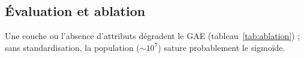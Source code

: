 \subsection{Évaluation et ablation}

\begin{table}[!ht]
\centering
\footnotesize
\caption{Ablation du GAE ($r=10\,\%$, 5 graines).}
\label{tab:ablation}
\setlength{\tabcolsep}{3pt}
\end{table}

Une couche ou l'absence d'attributs dégradent le GAE (tableau~\ref{tab:ablation}) ; sans standardisation, la population ($\sim10^7$) sature probablement le sigmoïde.
